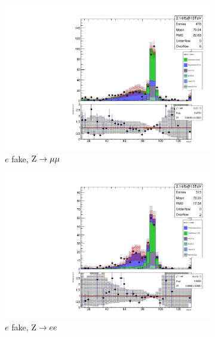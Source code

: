 \begin{figure}
\begin{center}
	\begin{subfigure}[b]{.5\textwidth}
		\includegraphics[width=\textwidth]{Background/bkg_fakeLight/Z_1el2mu_MOSSF}
		\caption{$e$ fake, $\mathrm{Z} \to \mu\mu$}
	\end{subfigure}%
	\begin{subfigure}[b]{.5\textwidth}
		\includegraphics[width=\textwidth]{Background/bkg_fakeLight/Z_3el_MOSSF}
		\caption{$e$ fake, $\mathrm{Z} \to e e$}
	\end{subfigure}
	\begin{subfigure}[b]{.5\textwidth}

\end{subfigure}
\end{center}
\end{figure}
